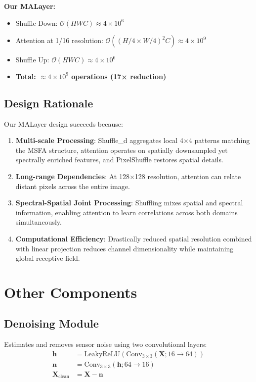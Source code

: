\documentclass[conference]{IEEEtran}
\begin{document}
\textbf{Our MALayer:}
\begin{itemize}
    \item Shuffle Down: $\mathcal{O}(HWC) \approx 4 \times 10^6$
    \item Attention at 1/16 resolution: $\mathcal{O}((H/4 \times W/4)^2 C) \approx 4 \times 10^9$
    \item Shuffle Up: $\mathcal{O}(HWC) \approx 4 \times 10^6$
    \item \textbf{Total: $\approx 4 \times 10^9$ operations (17× reduction)}
\end{itemize}

\subsection{Design Rationale}

Our MALayer design succeeds because:

\begin{enumerate}
    \item \textbf{Multi-scale Processing}: Shuffle\_d aggregates local 4×4 patterns matching the MSFA structure, attention operates on spatially downsampled yet spectrally enriched features, and PixelShuffle restores spatial details.
    
    \item \textbf{Long-range Dependencies}: At 128×128 resolution, attention can relate distant pixels across the entire image.
    
    \item \textbf{Spectral-Spatial Joint Processing}: Shuffling mixes spatial and spectral information, enabling attention to learn correlations across both domains simultaneously.
    
    \item \textbf{Computational Efficiency}: Drastically reduced spatial resolution combined with linear projection reduces channel dimensionality while maintaining global receptive field.
\end{enumerate}

\section{Other Components}

\subsection{Denoising Module}

Estimates and removes sensor noise using two convolutional layers:
\begin{equation}
\begin{aligned}
\mathbf{h} &= \text{LeakyReLU}(\text{Conv}_{3\times3}(\mathbf{X}; 16 \rightarrow 64)) \\
\mathbf{n} &= \text{Conv}_{3\times3}(\mathbf{h}; 64 \rightarrow 16) \\
\mathbf{X}_{\text{clean}} &= \mathbf{X} - \mathbf{n}
\end{aligned}
\end{equation}
\end{document}
